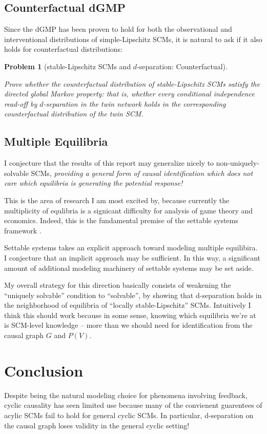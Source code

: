 \documentclass[letterpaper,10pt]{article}
\newtheorem{problem}{Problem}
\begin{document}
\subsection{Counterfactual dGMP}

Since the dGMP has been proven to hold for both the observational and interventional distributions of simple-Lipschitz SCMs, it is natural to ask if it also holds for counterfactual distributions:

\begin{problem}[stable-Lipschitz SCMs and $d$-separation: Counterfactual]
\label{prob:count}

Prove whether the counterfactual distribution of stable-Lipschitz SCMs satisfy the directed global Markov property: that is, whether every conditional independence read-off by $d$-separation in the twin network holds in the corresponding counterfactual distribution of the twin SCM.
\end{problem}

\subsection{Multiple Equilibria}

I conjecture that the results of this report may generalize nicely to non-uniquely-solvable SCMs, \emph{providing a general form of causal identification which does not care which equilibria is generating the potential response!}

This is the area of research I am most excited by, because currently the multiplicity of equlibria is a signicant difficulty for analysis of game theory and economics. Indeed, this is the fundamental premise of the settable systems framework \cite{White&Chalak}.

Settable systems takes an explicit approach toward modeling multiple equilibira. I conjecture that an implicit approach may be sufficient. In this way, a significant amount of additional modeling machinery of settable systems may be set aside.

My overall strategy for this direction basically consists of weakening the “uniquely solvable” condition to “solvable”, by showing that d-separation holds in the neighborhood of equilibria of “locally stable-Lipschitz” SCMs. 
Intuitively I think this should work because in some sense, knowing which equilibria we’re at is SCM-level knowledge – more than we should need for identification from the causal graph $G$ and $P(V)$.


\section{Conclusion}
Despite being the natural modeling choice for phenomena involving feedback, cyclic causality has seen limited use because many of the convienent guarentees of acylic SCMs fail to hold for general cyclic SCMs. In particular, d-separation on the causal graph loses validity in the general cyclic setting!
\end{document}
